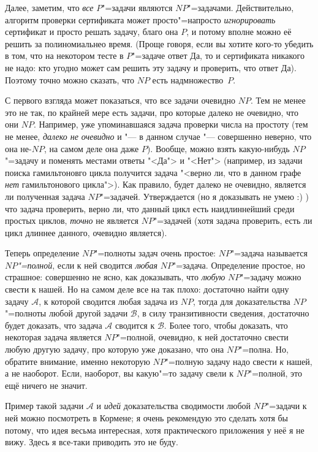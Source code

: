 \documentclass[a4paper,10pt]{problems}
\newcommand{\A}{{\ensuremath{\mathcal{A}}}}
\newcommand{\B}{{\ensuremath{\mathcal{B}}}}
\begin{document}
Далее, заметим, что \textit{все} $P$"=задачи являются $NP$"=задачами. 
Действительно, алгоритм проверки сертификата может просто"=напросто 
\textit{игнорировать} сертификат и просто решать задачу, благо она $P$, и 
потому вполне можно её решить за полиномиальнео время. (Проще говоря, если вы 
хотите кого-то убедить в том, что на некотором тесте в $P$"=задаче ответ Да, то 
и сертификата никакого не надо: кто угодно может сам решить эту задачу и 
проверить, что ответ Да). Поэтому точно можно сказать, что $NP$ есть 
надмножество~$P$.

 С первого взгляда может показаться, что все 
задачи очевидно $NP$. Тем не менее это не так, по крайней мере есть задачи, про 
которые далеко не очевидно, что они $NP$. Например, уже упоминавшаяся задача 
проверки числа на простоту (тем не менее, \textit{далеко не очевидно} и "--- в 
данном случае "--- совершенно неверно, что она не-$NP$, на самом деле она даже $P$). 
Вообще, можно взять 
какую-нибудь $NP$"=задачу и поменять местами ответы "<Да"> и "<Нет"> 
(например, из задачи поиска гамильтоновго цикла получится задача "<верно ли, что 
в данном графе \textit{нет} гамильтонового цикла">). Как 
правило, будет далеко не очевидно, является ли полученная задача $NP$"=задачей. 
Утверждается (но я доказывать не умею :) ) что задача проверить, 
верно ли, что данный цикл есть наидлиннейший среди простых циклов, 
\textit{точно} не является $NP$"=задачей (хотя задача проверить, есть ли цикл 
длиннее данного, очевидно является).

 Теперь определение $NP$"=полноты задач очень простое: 
$NP$"=задача называется \textit{$NP$"=полной}, если к ней сводится \textit{любая} 
$NP$"=задача. Определение простое, но страшное: совершенно не ясно, как 
доказывать, что \textit{любую} $NP$"=задачу можно свести к нашей. Но на самом 
деле все на так плохо: достаточно найти одну задачу \A, к которой сводится 
любая задача из $NP$, тогда для доказательства $NP$"=полноты любой другой 
задачи \B{}, в силу транзитивности сведения, достаточно будет доказать, что задача \A{} сводится к \B. Более 
того, чтобы доказать, что некоторая задача является $NP$"=полной, очевидно, 
к ней достаточно свести любую другую задачу, про которую уже доказано, что она 
$NP$"=полна. Но, обратите внимание, именно некоторую $NP$"=полную задачу надо свести 
\textit{к} нашей, а не наоборот. Если, наоборот, вы какую"=то задачу свели к 
$NP$"=полной, это ещё ничего не значит.

Пример такой задачи \A{} и \textit{идей} доказательства сводимости любой 
$NP$"=задачи к ней можно посмотреть в Кормене; я очень рекомендую это сделать 
хотя бы потому, что идея весьма интересная, хотя практического приложения у неё 
я не вижу. Здесь я все-таки приводить это не буду.
\end{document}

